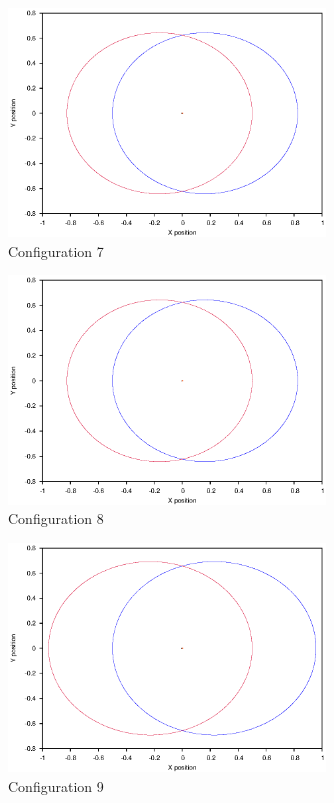 \documentclass[a4paper,12pt]{article}
\begin{document}
\begin{figure}[H]
\centering
\includegraphics[width=0.75\textwidth]{./results/005-58-005-4/Orbit.eps}
\caption{Configuration 7}
\label{fig:config7}
\end{figure}
\begin{figure}[H]
\centering
\includegraphics[width=0.75\textwidth]{./results/005-58-005-35/Orbit.eps}
\caption{Configuration 8}
\label{fig:config8}
\end{figure}
\begin{figure}[H]
\centering
\includegraphics[width=0.75\textwidth]{./results/006-6-006-3/Orbit.eps}
\caption{Configuration 9}
\label{fig:config9}
\end{figure}
\end{document}
